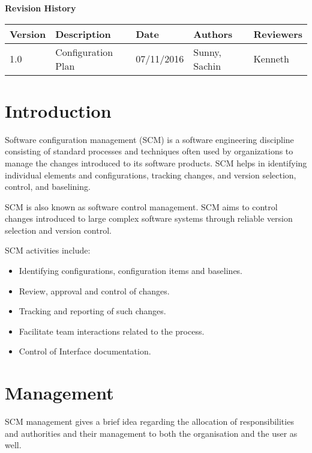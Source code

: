 \documentclass[12pt]{article}
\begin{document}
	\textbf{Revision History}
	\begin{center}
		\begin{tabular}{ | m{3em} | m{8em} | m{5em} | m{4em} | m{4em} | }
			\hline
			Version & Description & Date       & Authors            & Reviewers \\
			\hline
			1.0     & Configuration Plan    & 07/11/2016 & Sunny, Sachin & Kenneth  \\ 

			\hline
		
		\end{tabular}
	\end{center}
	
	\newpage
	\tableofcontents
	
	\newpage
\section{Introduction}
Software configuration management (SCM) is a software engineering discipline consisting of standard processes and techniques often used by organizations to manage the changes introduced to its software products. SCM helps in identifying individual elements and configurations, tracking changes, and version selection, control, and baselining.

SCM is also known as software control management. SCM aims to control changes introduced to large complex software systems through reliable version selection and version control.

SCM activities include:
\begin{itemize}
    \item Identifying configurations, configuration items and baselines.
    \item Review, approval and control of changes.
    \item Tracking and reporting of such changes. 
    \item Facilitate team interactions related to the process.
    \item Control of Interface documentation.
\end{itemize}

\section{Management}
SCM management gives a brief idea regarding the allocation of responsibilities and authorities and their management to both the organisation and the user as well.
\end{document}
